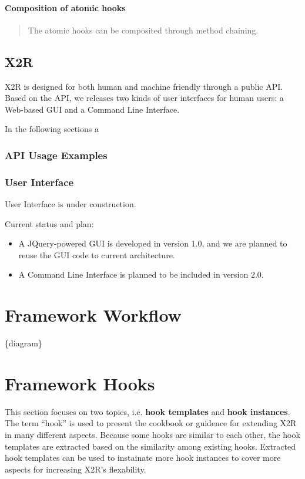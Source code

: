 \documentclass[letterpaper,10pt,english]{sphinxmanual}
\begin{document}
\subsubsection{Composition of atomic hooks}
\label{docs/uss:composition-of-atomic-hooks}\begin{quote}

The atomic hooks can be composited through method chaining.
\end{quote}


\section{X2R}
\label{docs/x2r:id1}\label{docs/x2r::doc}\label{docs/x2r:x2r}
X2R is designed for both human and machine friendly through a public API.
Based on the API, we releases two kinds of user interfaces for human users:
a Web-based GUI and a Command Line Interface.

In the following sections a


\subsection{API Usage Examples}
\label{docs/x2r:api-usage-examples}

\subsection{User Interface}
\label{docs/x2r:user-interface}
User Interface is under construction.

Current status and plan:
\begin{itemize}
\item {} 
A JQuery-powered GUI is developed in version 1.0, and we are planned to reuse the GUI code to current architecture.

\item {} 
A Command Line Interface is planned to be included in version 2.0.

\end{itemize}


\chapter{Framework Workflow}
\label{index:framework-workflow}
\{diagram\}


\chapter{Framework Hooks}
\label{index:framework-hooks}
This section focuses on two topics, i.e. \textbf{hook templates} and \textbf{hook instances}. The term ``hook'' is used to present the cookbook or guidence for extending X2R in many different aspects. Because some hooks are similar to each other, the hook templates are extracted based on the similarity among existing hooks. Extracted hook templates can be used to instainate more hook instances to cover more aspects for increasing X2R's flexability.
\end{document}
